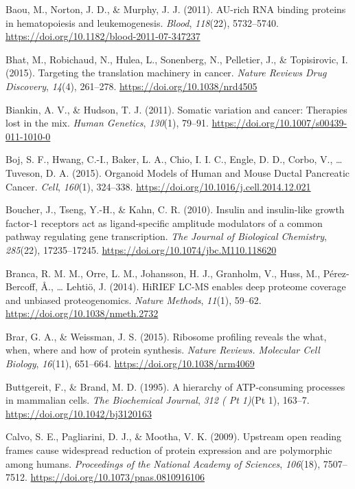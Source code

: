 \documentclass[12pt,openany]{book}
\begin{document}
\hypertarget{ref-Baou2011}{}
Baou, M., Norton, J. D., \& Murphy, J. J. (2011). AU-rich RNA binding
proteins in hematopoiesis and leukemogenesis. \emph{Blood},
\emph{118}(22), 5732--5740.
\url{https://doi.org/10.1182/blood-2011-07-347237}

\hypertarget{ref-Bhat2015}{}
Bhat, M., Robichaud, N., Hulea, L., Sonenberg, N., Pelletier, J., \&
Topisirovic, I. (2015). Targeting the translation machinery in cancer.
\emph{Nature Reviews Drug Discovery}, \emph{14}(4), 261--278.
\url{https://doi.org/10.1038/nrd4505}

\hypertarget{ref-Biankin2011}{}
Biankin, A. V., \& Hudson, T. J. (2011). Somatic variation and cancer:
Therapies lost in the mix. \emph{Human Genetics}, \emph{130}(1), 79--91.
\url{https://doi.org/10.1007/s00439-011-1010-0}

\hypertarget{ref-Boj2015}{}
Boj, S. F., Hwang, C.-I., Baker, L. A., Chio, I. I. C., Engle, D. D.,
Corbo, V., \ldots{} Tuveson, D. A. (2015). Organoid Models of Human and
Mouse Ductal Pancreatic Cancer. \emph{Cell}, \emph{160}(1), 324--338.
\url{https://doi.org/10.1016/j.cell.2014.12.021}

\hypertarget{ref-Boucher2010}{}
Boucher, J., Tseng, Y.-H., \& Kahn, C. R. (2010). Insulin and
insulin-like growth factor-1 receptors act as ligand-specific amplitude
modulators of a common pathway regulating gene transcription. \emph{The
Journal of Biological Chemistry}, \emph{285}(22), 17235--17245.
\url{https://doi.org/10.1074/jbc.M110.118620}

\hypertarget{ref-Branca2014}{}
Branca, R. M. M., Orre, L. M., Johansson, H. J., Granholm, V., Huss, M.,
Pérez-Bercoff, Å., \ldots{} Lehtiö, J. (2014). HiRIEF LC-MS enables deep
proteome coverage and unbiased proteogenomics. \emph{Nature Methods},
\emph{11}(1), 59--62. \url{https://doi.org/10.1038/nmeth.2732}

\hypertarget{ref-Brar2015}{}
Brar, G. A., \& Weissman, J. S. (2015). Ribosome profiling reveals the
what, when, where and how of protein synthesis. \emph{Nature Reviews.
Molecular Cell Biology}, \emph{16}(11), 651--664.
\url{https://doi.org/10.1038/nrm4069}

\hypertarget{ref-Buttgereit1995}{}
Buttgereit, F., \& Brand, M. D. (1995). A hierarchy of ATP-consuming
processes in mammalian cells. \emph{The Biochemical Journal}, \emph{312
( Pt 1)}(Pt 1), 163--7. \url{https://doi.org/10.1042/bj3120163}

\hypertarget{ref-Calvo2009}{}
Calvo, S. E., Pagliarini, D. J., \& Mootha, V. K. (2009). Upstream open
reading frames cause widespread reduction of protein expression and are
polymorphic among humans. \emph{Proceedings of the National Academy of
Sciences}, \emph{106}(18), 7507--7512.
\url{https://doi.org/10.1073/pnas.0810916106}
\end{document}
